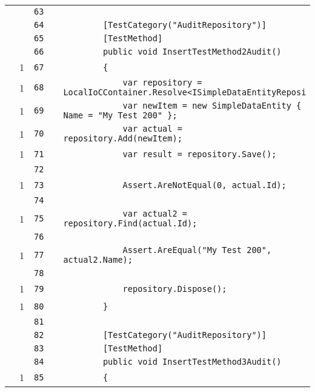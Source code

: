 \documentclass[a4paper,10pt]{article}
\begin{document}
\begin{longtable}[l]{lrrll}
\cellcolor{gray} &  & \verb~63~ & & \verb~~\\
\cellcolor{gray} &  & \verb~64~ & & \verb~        [TestCategory("AuditRepository")]~\\
\cellcolor{gray} &  & \verb~65~ & & \verb~        [TestMethod]~\\
\cellcolor{gray} &  & \verb~66~ & & \verb~        public void InsertTestMethod2Audit()~\\
\cellcolor{green} & 1 & \verb~67~ & & \verb~        {~\\
\cellcolor{green} & 1 & \verb~68~ & & \verb~            var repository = LocalIoCContainer.Resolve<ISimpleDataEntityReposi~\\
\cellcolor{green} & 1 & \verb~69~ & & \verb~            var newItem = new SimpleDataEntity { Name = "My Test 200" };~\\
\cellcolor{green} & 1 & \verb~70~ & & \verb~            var actual = repository.Add(newItem);~\\
\cellcolor{green} & 1 & \verb~71~ & & \verb~            var result = repository.Save();~\\
\cellcolor{gray} &  & \verb~72~ & & \verb~~\\
\cellcolor{green} & 1 & \verb~73~ & & \verb~            Assert.AreNotEqual(0, actual.Id);~\\
\cellcolor{gray} &  & \verb~74~ & & \verb~~\\
\cellcolor{green} & 1 & \verb~75~ & & \verb~            var actual2 = repository.Find(actual.Id);~\\
\cellcolor{gray} &  & \verb~76~ & & \verb~~\\
\cellcolor{green} & 1 & \verb~77~ & & \verb~            Assert.AreEqual("My Test 200", actual2.Name);~\\
\cellcolor{gray} &  & \verb~78~ & & \verb~~\\
\cellcolor{green} & 1 & \verb~79~ & & \verb~            repository.Dispose();~\\
\cellcolor{green} & 1 & \verb~80~ & & \verb~        }~\\
\cellcolor{gray} &  & \verb~81~ & & \verb~~\\
\cellcolor{gray} &  & \verb~82~ & & \verb~        [TestCategory("AuditRepository")]~\\
\cellcolor{gray} &  & \verb~83~ & & \verb~        [TestMethod]~\\
\cellcolor{gray} &  & \verb~84~ & & \verb~        public void InsertTestMethod3Audit()~\\
\cellcolor{green} & 1 & \verb~85~ & & \verb~        {~\\

\end{longtable}
\end{document}

